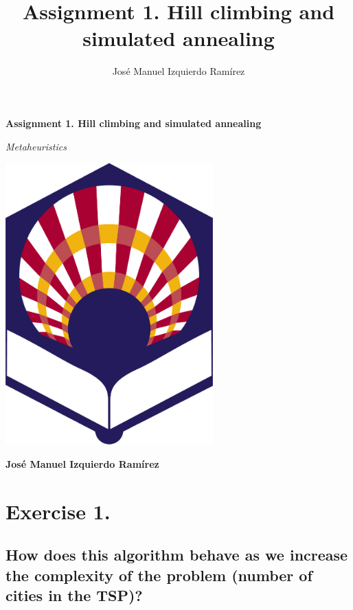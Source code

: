 \documentclass{article}
\title{Assignment 1. Hill climbing and simulated annealing }
\author{José Manuel Izquierdo Ramírez}
\begin{document}
    \begin{titlepage}
        
        \centering
        {\LARGE\bfseries Assignment 1. Hill climbing and simulated annealing \par}
        \vspace{0,5cm}
        {\itshape\Large Metaheuristics \par}
        \vspace{0,5cm}        
        \vspace{1cm}
        \includegraphics[width=0.6\textwidth]{../media/Logo_UCO.png}\par
        \vspace{3cm}
        {\LARGE\bfseries José Manuel Izquierdo Ramírez \par}


    \end{titlepage}
    
    \begin{index}
        \tableofcontents
        \newpage
        \listoffigures
    \end{index}

    \newpage
    
    \section{Exercise 1.}
    \subsection{How does this algorithm behave as we increase the complexity of the problem (number of cities in the TSP)?}
\end{document}

